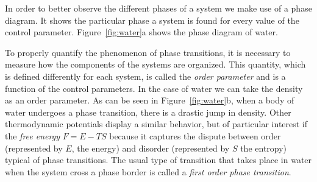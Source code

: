 In order to better observe the different phases of a system we make use of a
phase diagram. It shows the particular phase a system is found for every value
of the control parameter. Figure~\ref{fig:water}a shows the phase diagram
of water.


To properly quantify the phenomenon of phase transitions, it is necessary to
measure how the components of the systems are organized. This quantity, which
is defined differently for each system, is called the \textit{order parameter}
and is a function of the control parameters. In the case of water we can take
the density as an order parameter. As can be seen in Figure~\ref{fig:water}b,
when a body of water undergoes a phase transition, there is a drastic jump in
density. Other thermodynamic potentials display a similar behavior, but of
particular interest if the \textit{free energy} $F=E-TS$ because it captures
the dispute between order (represented by $E$, the energy) and disorder
(represented by $S$ the entropy) typical of phase transitions. The usual type
of transition that takes place in water when the system cross a phase border is
called a \textit{first order phase transition}.

